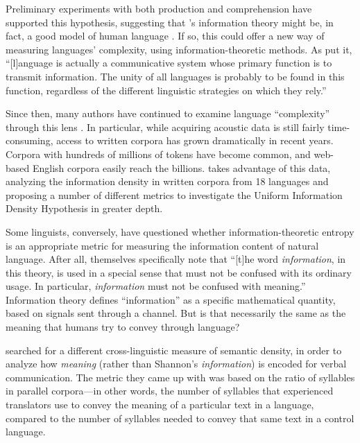 \documentclass[12pt,twoside]{article}
\begin{document}
Preliminary experiments with both production and comprehension have supported this hypothesis, suggesting that \citeauthor{shannon}'s information theory might be, in fact, a good model of human language \parencites[29]{jaeger}[970-971]{meister}. If so, this could offer a new way of measuring languages' complexity, using information-theoretic methods. As \citet[539]{pellegrino} put it, ``[l]anguage is actually a communicative system whose primary function is to transmit information. The unity of all languages is probably to be found in this function, regardless of the different linguistic strategies on which they rely.''

Since then, many authors have continued to examine language ``complexity'' through this lens \citep{pellegrino,oh,coupé}. In particular, while acquiring acoustic data is still fairly time-consuming, access to written corpora has grown dramatically in recent years. Corpora with hundreds of millions of tokens have become common, and web-based English corpora easily reach the billions. \citet{oh} takes advantage of this data, analyzing the information density in written corpora from 18 languages and proposing a number of different metrics to investigate the Uniform Information Density Hypothesis in greater depth.

Some linguists, conversely, have questioned whether information-theoretic entropy is an appropriate metric for measuring the information content of natural language. After all, \citet[8]{shannon} themselves specifically note that ``[t]he word \emph{information}, in this theory, is used in a special sense that must not be confused with its ordinary usage. In particular, \emph{information} must not be confused with meaning.'' Information theory defines ``information'' as a specific mathematical quantity, based on signals sent through a channel. But is that necessarily the same as the meaning that humans try to convey through language?

\citet{pellegrino} searched for a different cross-linguistic measure of semantic density, in order to analyze how \emph{meaning} (rather than Shannon's \emph{information}) is encoded for verbal communication. The metric they came up with was based on the ratio of syllables in parallel corpora---in other words, the number of syllables that experienced translators use to convey the meaning of a particular text in a language, compared to the number of syllables needed to convey that same text in a control language.

\end{document}
